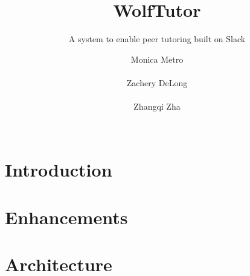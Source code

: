 \documentclass{sig-alternate-05-2015}
\begin{document}
\title{WolfTutor
}
\subtitle{A system to enable peer tutoring built on Slack
}

\author{
  \alignauthor
  {Monica Metro}\\
  \\
  \alignauthor
  {Zachery DeLong}\\
  \\
  \alignauthor 
  {Zhangqi Zha} \\
  \\
}
\maketitle



\section{Introduction}
\label{sec:intro}


\section{Enhancements}
\label{sec:enhancements}


\section{Architecture}
\label{sec:architecture}

\end{document}
